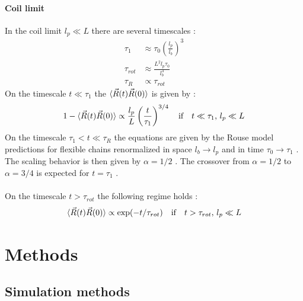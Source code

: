 \documentclass[
    paper=A4,pagesize=automedia,fontsize=12pt,
    BCOR=15mm,DIV=22,
    twoside,headinclude,footinclude=false,
    fleqn,             %
    bibliography=totocnumbered,          %
    listof=totoc,                %
    listof=flat,                 %
    cleardoublepage=empty      %
    numbers=endperiod
]{scrartcl}
\begin{document}
\paragraph{Coil limit}
In the coil limit $l_p \ll L$ there are several timescales \cite{Nikoubashman2016}:
\begin{equation}
    \begin{split}
        \tau_1 & \approx \tau_0 \left(\frac{l_p}{l_b}\right)^3 \\ 
        \tau_{rot} & \approx \frac{L^2 l_p \tau_0}{l_b^3} \\
        \tau_R & \propto \tau_{rot}
    \end{split}
\end{equation}
On the timescale $t \ll \tau_1$ the $\langle\vec{R}(t)\vec{R}(0)\rangle$ is given by \cite{Nikoubashman2016}:
\begin{equation}
    1 - \langle\vec{R}(t)\vec{R}(0)\rangle \propto \frac{l_p}{L}\left(\frac{t}{\tau_1}\right)^{3/4} \quad \text{if} \quad t \ll \tau_1 \text{, } l_p \ll L
\end{equation}
On the timescale $\tau_1 < t \ll \tau_R$ the equations are given by the Rouse model
predictions for flexible chains renormalized in space $l_b \rightarrow l_p$ and in time
$\tau_0 \rightarrow \tau_1$ \cite{Nikoubashman2016}. The scaling behavior is then
given by $\alpha=1/2$ \cite{Nikoubashman2016}. The crossover from $\alpha=1/2$ to
$\alpha=3/4$ is expected for $t=\tau_1$ \cite{Nikoubashman2016}.
\\
\\
On the timescale $t > \tau_{rot}$ the following regime holds \cite{Nikoubashman2016}:
\begin{equation} \label{eq:autocorr_ete_coil_limit_long_time}
    \langle\vec{R}(t)\vec{R}(0)\rangle \propto \exp(-t/\tau_{rot}) \quad \text{if} \quad t > \tau_{rot} \text{, } l_p \ll L
\end{equation}

\section{Methods}
\subsection{Simulation methods}
\end{document}

